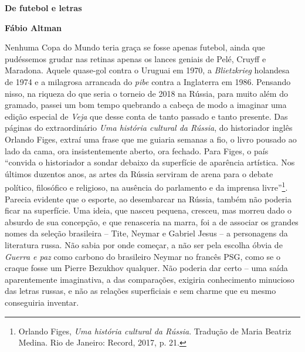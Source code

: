 \textbf{De futebol e letras}

\textbf{Fábio Altman}

Nenhuma Copa do Mundo teria graça se fosse apenas futebol, ainda que
pudéssemos grudar nas retinas apenas os lances geniais de Pelé, Cruyff e
Maradona. Aquele quase-gol contra o Uruguai em 1970, a
\emph{Blietzkrieg} holandesa de 1974 e a milagrosa arrancada do
\emph{pibe} contra a Inglaterra em 1986. Pensando nisso, na riqueza do
que seria o torneio de 2018 na Rússia, para muito além do gramado,
passei um bom tempo quebrando a cabeça de modo a imaginar uma edição
especial de \emph{Veja} que desse conta de tanto passado e tanto
presente. Das páginas do extraordinário \emph{Uma história cultural da
Rússia}, do historiador inglês Orlando Figes, extraí uma frase que me
guiaria semanas a fio, o livro pousado ao lado da cama, ora
insistentemente aberto, ora fechado. Para Figes, o país ``convida o
historiador a sondar debaixo da superfície de aparência artística. Nos
últimos duzentos anos, as artes da Rússia serviram de arena para o
debate político, filosófico e religioso, na ausência do parlamento e da
imprensa livre''\footnote{Orlando Figes, \emph{Uma história cultural da
  Rússia}. Tradução de Maria Beatriz Medina. Rio de Janeiro: Record,
  2017, p. 21.}. Parecia evidente que o esporte, ao desembarcar na
Rússia, também não poderia ficar na superfície. Uma ideia, que nasceu
pequena, cresceu, mas morreu dado o absurdo de sua concepção, e que
renasceria na marra, foi a de associar os grandes nomes da seleção
brasileira -- Tite, Neymar e Gabriel Jesus -- a personagens da
literatura russa. Não sabia por onde começar, a não ser pela escolha
óbvia de \emph{Guerra e paz} como carbono do brasileiro Neymar no
francês PSG, como se o craque fosse um Pierre Bezukhov qualquer. Não
poderia dar certo -- uma saída aparentemente imaginativa, a das
comparações, exigiria conhecimento minucioso das letras russas, e não as
relações superficiais e sem charme que eu mesmo conseguiria inventar.


